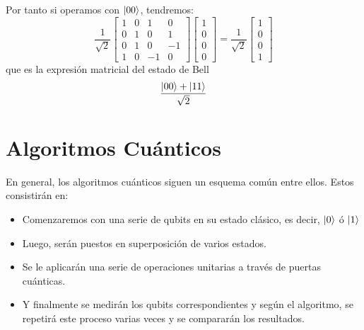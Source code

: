\documentclass[a4paper]{article}
\numberwithin{equation}{section}
\begin{document}
Por tanto si operamos con $\ket{00}$, tendremos:
\begin{equation}
\frac{1}{\sqrt{2}}
\begin{bmatrix}
1 & 0 & 1 & 0 \\
0 & 1 & 0 & 1 \\
0 & 1 & 0 & -1 \\
1 & 0 & -1 & 0
\end{bmatrix}
\begin{bmatrix}
1 \\ 0 \\ 0 \\ 0
\end{bmatrix} = 
\frac{1}{\sqrt{2}}
\begin{bmatrix}
1 \\ 0 \\ 0 \\ 1
\end{bmatrix}
\end{equation}
que es la expresión matricial del estado de Bell
\begin{equation}
\frac{\ket{00} + \ket{11}}{\sqrt{2}}
\end{equation}
\newpage

\section{Algoritmos Cuánticos}

En general, los algoritmos cuánticos siguen un esquema común entre ellos. Estos consistirán en:
\begin{itemize}
\item Comenzaremos con una serie de qubits en su estado clásico, es decir, $\ket{0}$ ó $\ket{1}$
\item Luego, serán puestos en superposición de varios estados.
\item Se le aplicarán una serie de operaciones unitarias a través de puertas cuánticas.
\item Y finalmente se medirán los qubits correspondientes y según el algoritmo, se repetirá este proceso varias veces y se compararán los resultados.

\end{itemize}
\end{document}
